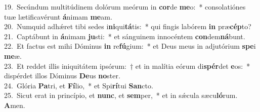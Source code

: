 {19.~}Secúndum multitúdinem dolórum meórum in \textbf{cor}de \textbf{me}o:~* consolatiónes tuæ lætificavérunt \textbf{á}nimam \textbf{me}am.\\
{20.~}Numquid adhǽret tibi sedes i\textbf{ni}qui\textbf{tá}tis:~* qui fingis labórem \textbf{in} præ\textbf{cép}to?\\
{21.~}Captábunt in \textbf{á}nimam \textbf{ju}sti:~* et sánguinem innocéntem \textbf{con}dem\textbf{ná}bunt.\\
{22.~}Et factus est mihi Dóminus \textbf{in} re\textbf{fú}gium:~* et Deus meus in adjutórium \textbf{spe}i \textbf{me}æ.\\
{23.~}Et reddet illis iniquitátem ipsórum:~† et in malítia eórum di\textbf{spér}det \textbf{e}os:~* dispérdet illos Dóminus \textbf{De}us \textbf{no}ster.\\
{24.~}Glória \textbf{Pa}tri, et \textbf{Fí}lio,~* et Spi\textbf{rí}tui \textbf{San}cto.\\
{25.~}Sicut erat in princípio, et \textbf{nunc}, et \textbf{sem}per,~* et in sǽcula sæcu\textbf{ló}rum. \textbf{A}men.\\
